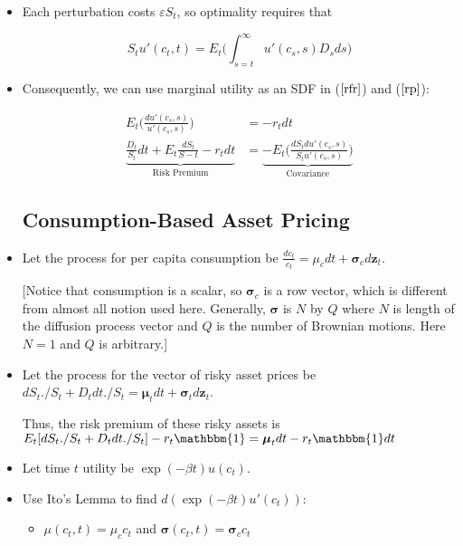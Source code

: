 \documentclass{article}
\newcommand{\zbf}{\mathbf{z}}
\newcommand{\mubf}{\boldsymbol{\mu}}
\newcommand{\sigmabf}{\boldsymbol{\sigma}}
\newcommand{\onebf}{\mathbbm{1}}
\begin{document}
\begin{itemize}
\begin{enumerate}
\end{enumerate}

\item Each perturbation costs $\varepsilon S_t$, so optimality requires that

$$
S_t u'(c_t, t) = E_t \Bigg( \int_{s=t}^{\infty} u'(c_s, s) D_s ds \Bigg)
$$

\item Consequently, we can use marginal utility as an SDF in ($\ref{rfr}$) and ($\ref{rp}$):

\begin{align*}
E_t \Bigg( \frac{du'(c_s, s)}{u'(c_s, s)} \Bigg) &= - r_t dt \\
\underbrace{\frac{D_t}{S_t} dt + E_t \frac{dS_t}{S-t} - r_t dt}_{\text{Risk Premium}} &= \underbrace{- E_t\Bigg(\frac{dS_t du'(c_s, s)}{S_t u'(c_s, s)}\Bigg)}_{\text{Covariance}}
\end{align*}

\subsection*{Consumption-Based Asset Pricing}

\item Let the process for per capita consumption be $\frac{dc_t}{c_t} = \mu_c dt + \sigmabf_c d\zbf_t$.

[Notice that consumption is a scalar, so $\sigmabf_c$ is a row vector, which is different from almost all notion used here.  Generally, $\sigmabf$ is $N$ by $Q$ where $N$ is length of the diffusion process vector and $Q$ is the number of Brownian motions. Here $N=1$ and $Q$ is arbitrary.]

\item Let the process for the vector of risky asset prices be $dS_t ./ S_t + D_t dt ./S_t = \mubf_t dt + \sigmabf_t d \zbf_t$.  

Thus, the risk premium of these risky assets is $E_t[dS_t ./ S_t + D_t dt ./S_t] - r_t \onebf = \mubf_tdt - r_t\onebf dt$

\item Let time $t$ utility be $\exp(-\beta t) u(c_t)$. 

\item Use Ito's Lemma to find $d(\exp(-\beta t) u'(c_t))$:

\begin{itemize}

\item $\mu(c_t, t) = \mu_c c_t$ and $\sigmabf(c_t, t) = \sigmabf_c c_t$


\end{itemize}
\end{itemize}
\end{document}
